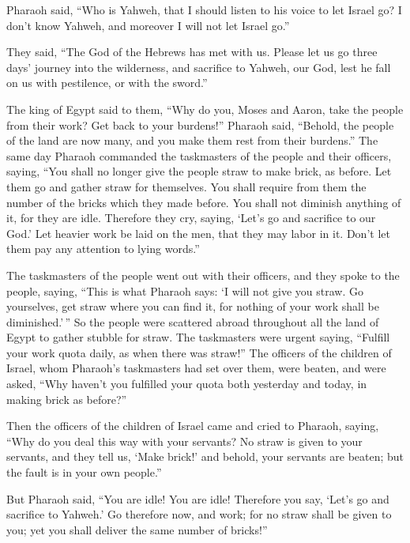  Pharaoh said, ``Who is Yahweh, that I should listen to his
voice to let Israel go? I don't know Yahweh, and moreover I will not let
Israel go.''

 They said, ``The God of the Hebrews has met with us. Please
let us go three days' journey into the wilderness, and sacrifice to
Yahweh, our God, lest he fall on us with pestilence, or with the
sword.''

 The king of Egypt said to them, ``Why do you, Moses and
Aaron, take the people from their work? Get back to your burdens!''
 Pharaoh said, ``Behold, the people of the land are now
many, and you make them rest from their burdens.''  The same
day Pharaoh commanded the taskmasters of the people and their officers,
saying,  ``You shall no longer give the people straw to make
brick, as before. Let them go and gather straw for themselves.
 You shall require from them the number of the bricks which
they made before. You shall not diminish anything of it, for they are
idle. Therefore they cry, saying, `Let's go and sacrifice to our God.'
 Let heavier work be laid on the men, that they may labor in
it. Don't let them pay any attention to lying words.''

 The taskmasters of the people went out with their
officers, and they spoke to the people, saying, ``This is what Pharaoh
says: `I will not give you straw.  Go yourselves, get straw
where you can find it, for nothing of your work shall be
diminished.'\,''  So the people were scattered abroad
throughout all the land of Egypt to gather stubble for straw.
 The taskmasters were urgent saying, ``Fulfill your work
quota daily, as when there was straw!''  The officers of
the children of Israel, whom Pharaoh's taskmasters had set over them,
were beaten, and were asked, ``Why haven't you fulfilled your quota both
yesterday and today, in making brick as before?''

 Then the officers of the children of Israel came and cried
to Pharaoh, saying, ``Why do you deal this way with your servants?
 No straw is given to your servants, and they tell us,
`Make brick!' and behold, your servants are beaten; but the fault is in
your own people.''

 But Pharaoh said, ``You are idle! You are idle! Therefore
you say, `Let's go and sacrifice to Yahweh.'  Go therefore
now, and work; for no straw shall be given to you; yet you shall deliver
the same number of bricks!''


